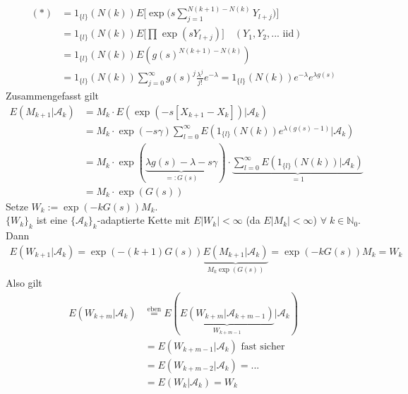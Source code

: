 \documentclass[a4paper,openany]{book}
\theoremstyle{mytheoremstyle}
\theoremstyle{mytheoremstyle2}
\begin{document}
\begin{align*}
  (*)
  &=1 _{\{l\}}(N(k))E \bigg[\exp \bigg(s \sum_{j=1}^{N(k+1)-N(k)}{Y _{l+j}}\bigg)\bigg]\\
  &=1 _{\{l\}}(N(k))E \bigg[\prod_{}^{}{}\exp (s {Y _{l+j}})\bigg]\quad (Y_1,Y_2,... \text{ iid})\\
  &=1 _{\{l\}}(N(k))E(g(s)^{N(k+1)-N(k)})\\
  &=1 _{\{l\}}(N(k))\sum_{j=0}^{\infty }{g(s)^j \frac{\lambda ^j}{j!}e^{-\lambda }}=1 _{\{l\}}(N(k))e^{-\lambda }e^{\lambda g(s)}
\end{align*}
Zusammengefasst gilt
\begin{align*}
  E(M _{k+1}|\mathcal{A}_k)
  &=M_k \cdot E(\exp(-s[X _{k+1}-X_k])|\mathcal{A}_k)\\
  &=M_k \cdot \exp(-s \gamma )\sum_{l=0}^{\infty }{E(1_{\{l\}}(N(k))e^{\lambda (g(s)-1)}|\mathcal{A}_k)}\\
  &=M_k \cdot \exp(\underbrace{\lambda g(s)-\lambda -s \gamma }_{=:G(s)})\cdot \underbrace{\sum_{l=0}^{\infty }{E(1_{\{l\}}(N(k))|\mathcal{A}_k)}}_{=1}\\
  &=M_k \cdot \exp(G(s))
\end{align*}
Setze $W_k:=\exp(-kG(s))M_k$. \\
$\{W_k\}_k$ ist eine $\{\mathcal{A}_k\}_k$-adaptierte Kette mit $E|W_k|<\infty $ (da $E|M_k|<\infty $) $\forall\;k \in \mathbb{N}_0$. Dann
\begin{align*}
  E(W _{k+1}|\mathcal{A}_k)=\exp(-(k+1)G(s))\underbrace{E(M _{k+1}|\mathcal{A}_k)}_{M_k\exp (G(s))}=\exp(-kG(s))M_k=W_k
\end{align*}
Also gilt 
\begin{align*}
  E(W _{k+m}|\mathcal{A}_k)
  &\!\!\overset{\text{eben}}=E(\underbrace{E(W _{k+m}|\mathcal{A}_{k+m-1})}_{W _{k+m-1}}|\mathcal{A}_k)\\
  &=E(W _{k+m-1}|\mathcal{A}_k)\text{ fast sicher}\\
  &=E(W _{k+m-2}|\mathcal{A}_k)=...\\
  &=E(W_k|\mathcal{A}_k)=W_k
\end{align*}
\end{document}
